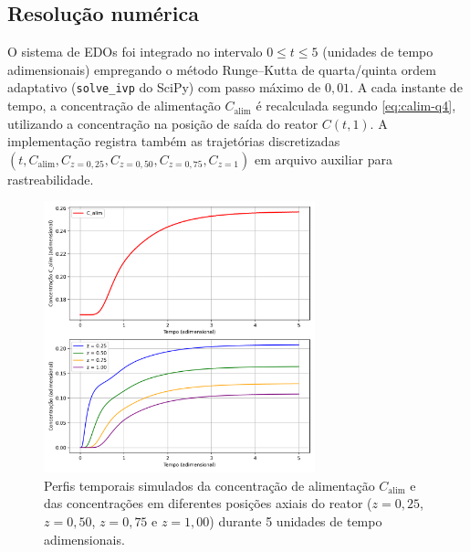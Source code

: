 \documentclass{article}
\begin{document}
\subsection*{Resolução numérica}
O sistema de EDOs foi integrado no intervalo $0 \leq t \leq 5$ (unidades de tempo adimensionais) empregando o método Runge--Kutta de quarta/quinta ordem adaptativo (\texttt{solve\_ivp} do SciPy) com passo máximo de $0{,}01$. A cada instante de tempo, a concentração de alimentação $C_{\text{alim}}$ é recalculada segundo \eqref{eq:calim-q4}, utilizando a concentração na posição de saída do reator $C(t,1)$. A implementação registra também as trajetórias discretizadas $(t, C_{\text{alim}}, C_{z=0{,}25}, C_{z=0{,}50}, C_{z=0{,}75}, C_{z=1})$ em arquivo auxiliar para rastreabilidade.



\begin{figure}[ht]
  \centering
  \includegraphics[width=0.7\textwidth]{figuras/questao4_reator_dispersao.png}
  \caption{Perfis temporais simulados da concentração de alimentação $C_{\text{alim}}$ e das concentrações em diferentes posições axiais do reator ($z=0{,}25$, $z=0{,}50$, $z=0{,}75$ e $z=1{,}00$) durante 5 unidades de tempo adimensionais.}
  \label{fig:questao4}
\end{figure}
\end{document}
